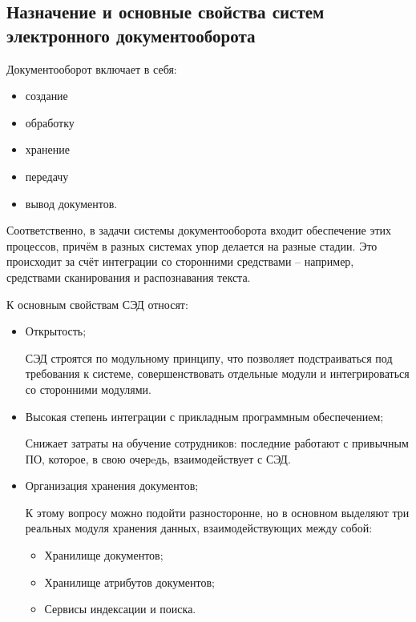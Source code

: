 \subsection{Назначение и основные свойства систем электронного документооборота} \label{review_common}

Документооборот включает в себя:
\begin{itemize}
	\item создание
	\item обработку
	\item хранение
	\item передачу
	\item вывод документов.
\end{itemize}

\vspace{\baselineskip}
Соответственно, в задачи системы документооборота входит обеспечение этих процессов, причём в разных системах упор делается на разные стадии. Это происходит за счёт интеграции со сторонними средствами – например, средствами сканирования и распознавания текста.

\vspace{\baselineskip}
К основным свойствам СЭД относят:
\begin{itemize}
	\item Открытость;
		
		СЭД строятся по модульному принципу, что позволяет подстраиваться под требования к системе, совершенствовать отдельные модули и интегрироваться со сторонними модулями.
	\item Высокая степень интеграции с прикладным программным обеспечением;

	Снижает затраты на обучение сотрудников: последние работают с привычным ПО, которое, в свою очерeдь, взаимодействует с СЭД.
	\item Организация хранения документов;

	К этому вопросу можно подойти разносторонне, но в основном выделяют три реальных модуля хранения данных, взаимодействующих между собой:
	\begin{itemize}
		\item Хранилище документов;
		\item Хранилище атрибутов документов;
		\item Сервисы индексации и поиска.
	\end{itemize}
\end{itemize}

